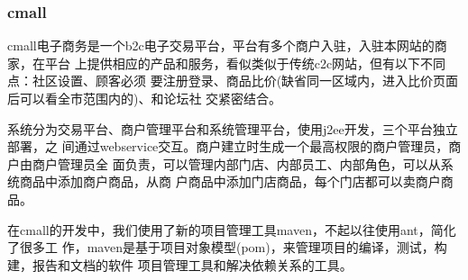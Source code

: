 \subsubsection{cmall}

cmall电子商务是一个b2c电子交易平台，平台有多个商户入驻，入驻本网站的商家，在平台
上提供相应的产品和服务，看似类似于传统c2c网站，但有以下不同点：社区设置、顾客必须
要注册登录、商品比价(缺省同一区域内，进入比价页面后可以看全市范围内的)、和论坛社
交紧密结合。

系统分为交易平台、商户管理平台和系统管理平台，使用j2ee开发，三个平台独立部署，之
间通过webservice交互。商户建立时生成一个最高权限的商户管理员，商户由商户管理员全
面负责，可以管理内部门店、内部员工、内部角色，可以从系统商品中添加商户商品，从商
户商品中添加门店商品，每个门店都可以卖商户商品。

在cmall的开发中，我们使用了新的项目管理工具maven，不起以往使用ant，简化了很多工
作，maven是基于项目对象模型(pom)，来管理项目的编译，测试，构建，报告和文档的软件
项目管理工具和解决依赖关系的工具。


\newpage
